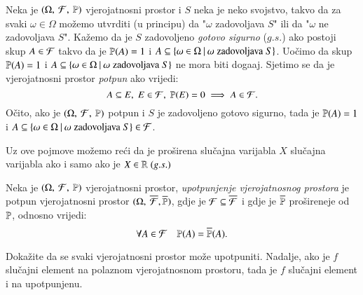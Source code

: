 \begin{nap} \label{nap:3.9}
    Neka je $(\Omega, \: \mathcal{F}, \: \mathbb{P})$ vjerojatnosni prostor i $S$ neka je neko svojstvo, takvo da za svaki $\omega \in \Omega$ mo\v zemo utvrditi (u principu) da "$\omega$ zadovoljava $S$" ili da "$\omega$ ne zadovoljava $S$".
    Ka\v zemo da je $S$ zadovoljeno \emph{gotovo sigurno} ($g.s.$) ako postoji skup $A \in \mathcal{F}$ takvo da je $\mathbb{P}({A}) = 1$ i $A \subseteq \{{\omega \in \Omega} \: | \: {\omega \; \textnormal{zadovoljava} \; S}\}$.
    Uo\v cimo da skup $\mathbb{P}({A}) = 1$ i $A \subseteq \{{\omega \in \Omega} \: | \: {\omega \; \textnormal{zadovoljava} \; S}\}$ ne mora biti doga\dj aj.
    Sjetimo se da je vjerojatnosni prostor \emph{potpun} ako vrijedi:
    \begin{equation*}
        A \subseteq E, \; E \in \mathcal{F}, \; \mathbb{P}({E}) = 0 \implies A \in \mathcal{F}.
    \end{equation*}
    O\v cito, ako je $(\Omega, \: \mathcal{F}, \: \mathbb{P})$ potpun i $S$ je zadovoljeno gotovo sigurno, tada je $\mathbb{P}({A}) = 1$ i $A \subseteq \{{\omega \in \Omega} \: | \: {\omega \; \textnormal{zadovoljava} \; S}\} \in \mathcal{F}$.

    Uz ove pojmove mo\v zemo re\' ci da je pro\v sirena slu\v cajna varijabla $X$ slu\v cajna varijabla ako i samo ako je $X \in \mathbb{R} \; (g.s.)$
\end{nap}

\begin{nap} \label{nap:3.9-1}
    Neka je $(\Omega, \: \mathcal{F}, \: \mathbb{P})$ vjerojatnosni prostor, \emph{upotpunjenje vjerojatnosnog prostora} je potpun vjerojatnosni prostor $(\Omega, \: \overline{\mathcal{F}}, \overline{\mathbb{P}})$, gdje je $\mathcal{F} \subseteq \overline{\mathcal{F}}$ i gdje je $\overline{\mathbb{P}}$ pro\v sireneje od $\mathbb{P}$, odnosno vrijedi:
    \begin{equation*}
        \forall A \in \mathcal{F} \quad \mathbb{P}({A}) = \overline{\mathbb{P}}(A).
    \end{equation*}
\end{nap}

\begin{zad} \label{zad:3.10}
    Doka\v zite da se svaki vjerojatnosni prostor mo\v ze upotpuniti.
    Nadalje, ako je $f$ slu\v cajni element na polaznom vjerojatnosnom
    prostoru, tada je $f$ slu\v cajni element i na upotpunjenu.
\end{zad}


